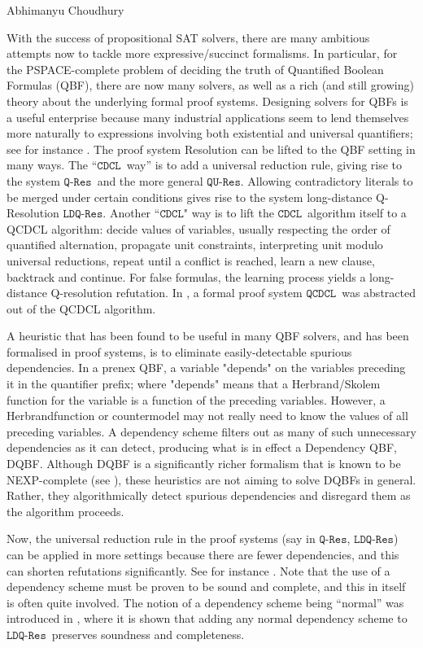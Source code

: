 \documentclass[report]{owrart}
\newcommand{\Res}{\mbox{$\mathtt{Res}$}}
\newcommand{\CDCL}{\mbox{$\mathtt{CDCL}$}}
\newcommand{\QCDCL}{\mbox{$\mathtt{QCDCL}$}}
\newcommand{\QRes}{\mbox{$\mathtt{Q}$-$\Res$}} %
\newcommand{\QURes}{\mbox{$\mathtt{QU}$-$\Res$}} %
\newcommand{\LDQRes}{\mbox{$\mathtt{LDQ}$-$\Res$}} %
\begin{document}
\begin{report}
\begin{talk}{Abhimanyu Choudhury}
  
  With the success of propositional SAT solvers, there are many ambitious attempts now to tackle more expressive/succinct formalisms.  In particular, for
  the PSPACE-complete problem of deciding the truth of Quantified Boolean Formulas (QBF), there are now many solvers, as well as a rich (and still growing) theory about the underlying formal proof systems. Designing solvers for QBFs is a useful enterprise because many industrial applications seem to lend themselves more naturally to expressions involving both existential and universal quantifiers; see for instance \cite{SBPS-ICTAI19,BJLS21}. 
  The proof system Resolution can be lifted to the QBF setting in many ways. The ``\CDCL\ way'' is to add a universal reduction rule, giving rise to the system \QRes\ and the more general \QURes. Allowing contradictory literals to be merged under certain conditions gives rise to the system long-distance Q-Resolution \LDQRes.
  Another ``\CDCL" way is to lift the \CDCL\ algorithm itself to a QCDCL algorithm: decide values of variables, usually respecting the order of quantified alternation, propagate unit constraints, interpreting unit modulo universal reductions, repeat until a conflict is reached, learn a new clause, backtrack and continue.
  For false formulas, the learning process yields a long-distance Q-resolution refutation.  In \cite{BB-LMCS23}, a formal proof
  system \QCDCL\ was abstracted out of the QCDCL algorithm.
  
  
  A heuristic that has been found to be useful in many QBF solvers, and has been formalised in proof systems, is to eliminate easily-detectable spurious dependencies. In a prenex QBF, a variable "depends" on the variables preceding it in the quantifier prefix; where "depends" means that a Herbrand/Skolem function for the variable is a function of the preceding variables. However, a Herbrandfunction or countermodel may not really need to know the values of all preceding variables. A dependency scheme filters out as many of such
  unnecessary dependencies as it can detect, producing what is in effect a Dependency QBF, DQBF. Although DQBF is a significantly richer formalism that is known to be NEXP-complete (see \cite{APR-JCMA01,SW-SAT18}), these heuristics are not aiming to solve DQBFs in general. Rather, they algorithmically detect spurious dependencies and disregard them as the algorithm proceeds. 
  
  Now, the universal reduction rule in the proof systems (say in \QRes, \LDQRes) can be applied in more settings because there are fewer dependencies, and this can shorten refutations
  significantly. See for instance \cite{BB-SAT17,SS-TCS16,PSS-JAR19}. Note that the use of a dependency scheme must be proven to be sound and complete, and this in itself is often quite involved. The  notion of a dependency scheme being ``normal'' was introduced in \cite{PSS-JAR19}, where it is shown that adding any normal dependency scheme to \LDQRes\ preserves soundness and completeness. 
  

\end{talk}
\end{report}
\end{document}
